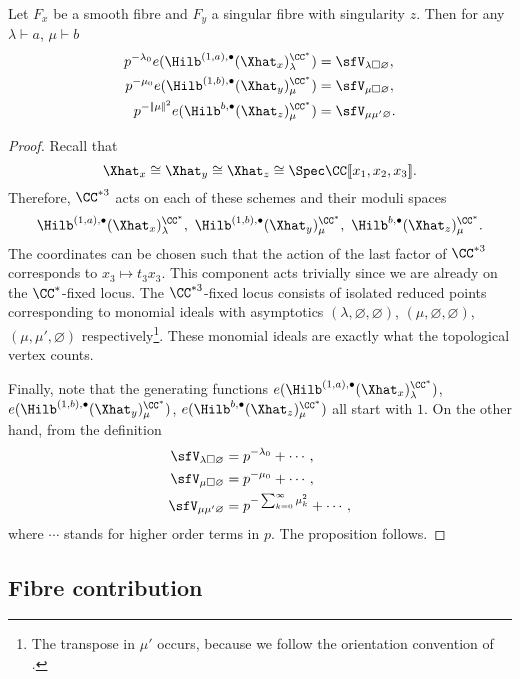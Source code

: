 \begin{proposition} \label{vertex1}
Let $F_x$ be a smooth fibre and $F_y$ a singular fibre with singularity $z$. Then for any $\lambda \vdash a$, $\mu \vdash b$
\begin{align*}
p^{-\lambda_0} e(\Hilb^{(1,a),\bullet}(\Xhat _x)_{\lambda}^{\CC^*}) &= \sfV_{\lambda\square\varnothing}, \\
p^{-\mu_0} e(\Hilb^{(1,b),\bullet}(\Xhat _y)_{\mu}^{\CC^*}) &= \sfV_{\mu\square\varnothing}, \\
p^{-|\!|\mu|\!|^2} e(\Hilb^{b,\bullet}(\Xhat _z)_{\mu}^{\CC^*}) &= \sfV_{\mu\mu'\varnothing}.
\end{align*}
\end{proposition}
\begin{proof}
Recall that $$\Xhat _x \cong \Xhat _y \cong \Xhat _z \cong \Spec \CC[\![x_1,x_2,x_3]\!].$$ Therefore, $\CC^{*3}$ acts on each of these schemes and their moduli spaces 
$$
\Hilb^{(1,a),\bullet}(\Xhat _x)_{\lambda}^{\CC^*}, \ \Hilb^{(1,b),\bullet}(\Xhat _y)_{\mu}^{\CC^*}, \ \Hilb^{b,\bullet}(\Xhat _z)_{\mu}^{\CC^*}.
$$
The coordinates can be chosen such that the action of the last factor
of $\CC^{*3}$ corresponds to $x_3 \mapsto t_3 x_3$. This component
acts trivially since we are already on the $\CC^*$-fixed locus. The
$\CC^{*3}$-fixed locus consists of isolated reduced points
corresponding to monomial ideals with asymptotics
$(\lambda,\varnothing,\varnothing)$, $(\mu,\varnothing,\varnothing)$,
$(\mu,\mu',\varnothing)$ respectively\footnote{The transpose in $\mu'$
occurs, because we follow the orientation convention of
\cite{Bryan-Kool-Young}.}. These monomial ideals are exactly what the topological
vertex counts.

Finally, note that the generating functions
$e(\Hilb^{(1,a),\bullet}(\Xhat _x)_{\lambda}^{\CC^*})$,
$e(\Hilb^{(1,b),\bullet}(\Xhat _y)_{\mu}^{\CC^*})$,
$e(\Hilb^{b,\bullet}(\Xhat _z)_{\mu}^{\CC^*})$ all start with $1$. On
the other hand, from the definition
\begin{align*}
\sfV_{\lambda\square\varnothing} &= p^{-\lambda_0} + \cdots, \\
\sfV_{\mu\square\varnothing} &= p^{-\mu_0} + \cdots, \\
\sfV_{\mu\mu'\varnothing} &= p^{-\sum_{k=0}^{\infty} \mu_{k}^{2}} + \cdots,
\end{align*}
where $\cdots$ stands for higher order terms in $p$. The proposition follows.
\end{proof}


\subsection{Fibre contribution}

